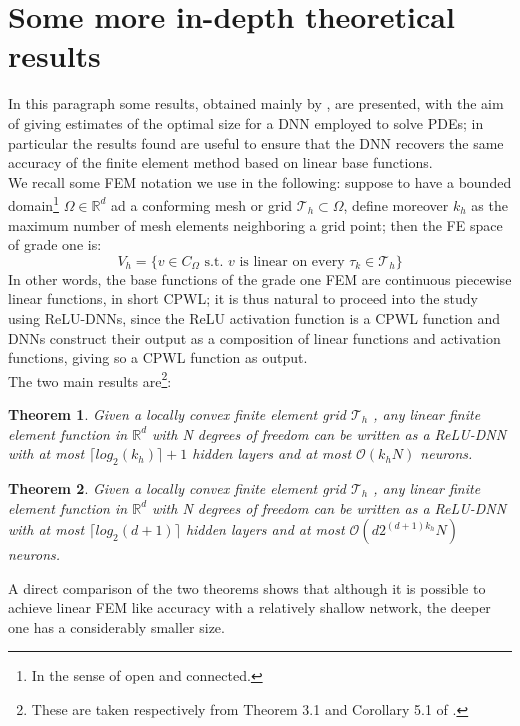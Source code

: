 \documentclass[12pt, a4paper]{report}
\theoremstyle{definition}
\newtheorem{Theorem}{Theorem}
\begin{document}
{\section{Some more in-depth theoretical results}\label{section2.2}
In this paragraph some results, obtained mainly by \cite{Jinchao}, are presented, with the aim of giving estimates of the optimal size for a DNN employed to solve PDEs; in particular the results found are useful to ensure that the DNN recovers the same accuracy of the finite element method based on linear base functions.\\
We recall some FEM notation we use in the following: suppose to have a bounded domain\footnote{In the sense of open and connected.} $\Omega\in\mathbb{R}^d$ ad a conforming mesh or grid $\mathcal{T}_h\subset\Omega$, define moreover $k_h$ as the maximum number of mesh elements neighboring a grid point; then the FE space of grade one is:
\[ V_h=\{ v \in C_\Omega \text{ s.t. $v$ is linear on every } \tau_k \in \mathcal T_h \} \]
In other words, the base functions of the grade one FEM are continuous piecewise linear functions, in short CPWL; it is thus natural to proceed into the study using ReLU-DNNs, since the ReLU activation function is a CPWL function and DNNs construct their output as a composition of linear functions and activation functions, giving so a CPWL function as output.\\
\newline \noindent The two main results are\footnote{These are taken respectively from Theorem 3.1 and Corollary 5.1 of \cite{Jinchao}.}:
\begin{Theorem}\label{thm3.1}
	\textit{Given a locally convex finite element grid $\mathcal T_h$ , any linear finite element function in $\mathbb R^d$ with N degrees of freedom can be written as a ReLU-DNN with at most $\lceil log_2 (k_h)\rceil +1$ hidden layers and at most $\mathcal O(k_hN)$ neurons.}
\end{Theorem}
\begin{Theorem}\label{corol5.1}
	\textit{Given a locally convex finite element grid $\mathcal T_h$ , any linear finite element function in $\mathbb R^d$ with N degrees of freedom can be written as a ReLU-DNN with at most $\lceil log_2 (d+1)\rceil$ hidden layers and at most $\mathcal O(d2^{(d+1)k_h}N)$ neurons.}	
\end{Theorem}
\noindent A direct comparison of the two theorems shows that although it is possible to achieve linear FEM like accuracy with a relatively shallow network, the deeper one has a considerably smaller size.\\
}
\end{document}
